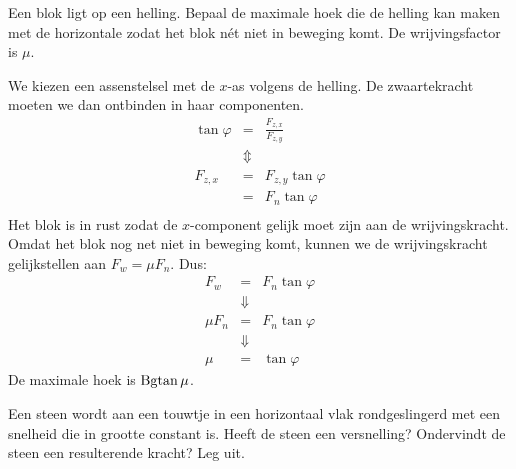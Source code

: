 \begin{exercise} Een blok ligt op een helling. Bepaal de maximale hoek die de
helling kan maken met de horizontale zodat het blok n\'et niet in
beweging komt. De wrijvingsfactor is $\mu$.
\begin{oplossing}
\newline
We kiezen een assenstelsel met de $x$-as volgens de helling. De
zwaartekracht moeten we dan ontbinden in haar componenten.
\begin{eqnarray*}
\tan{\varphi}&=&\frac{F_{z,x}}{F_{z,y}}\\
&\Updownarrow&\\
F_{z,x}&=&F_{z,y}\tan{\varphi}\\
&=&F_n\tan{\varphi}\\
\end{eqnarray*}
Het blok is in rust zodat de $x$-component gelijk moet zijn aan de
wrij\-vings\-kracht. Omdat het blok nog net niet in beweging komt,
kunnen we de wrijvingskracht gelijkstellen aan $F_w=\mu F_n$. Dus:
\begin{eqnarray*}
F_w&=&F_n\tan{\varphi}\\
&\Downarrow&\\
\mu F_n&=&F_n\tan{\varphi}\\
&\Downarrow&\\
\mu&=&\tan{\varphi}
\end{eqnarray*}
De maximale hoek is ${\rm Bgtan\,}\mu$.
\end{oplossing}

\end{exercise}

\begin{exercise} Een steen wordt aan een touwtje in een horizontaal vlak rondgeslingerd met een snelheid die in grootte constant is. Heeft de steen een versnelling? Ondervindt de steen een resulterende kracht? Leg uit.


\end{exercise}

